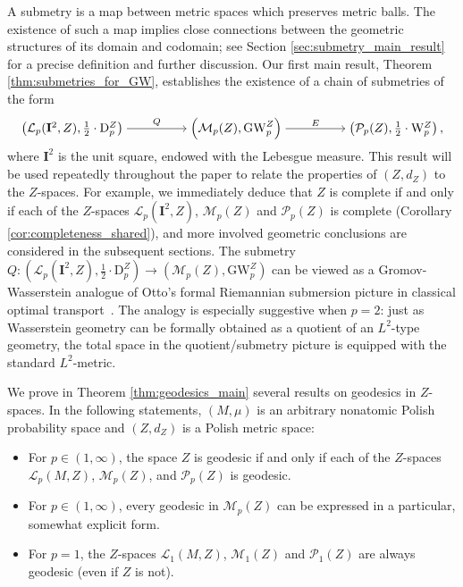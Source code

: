 \documentclass{article}
\theoremstyle{definition}
\newcommand{\M}{\mathcal{M}}
\newcommand{\MZp}{\M_p(Z)}
\newcommand{\MZ}[1]{\M_{#1}(Z)}
\newcommand{\dgwz}{\mathrm{GW}_p^Z}
\newcommand{\WZ}{\mathcal{P}_p(Z)}
\newcommand{\WZp}[1]{\mathcal{P}_{#1}(Z)}
\newcommand{\wz}{\mathrm{W}_p^Z}
\newcommand{\Lp}{\mathcal{L}_p}
\newcommand{\Lpp}[1]{\mathcal{L}_{#1}}
\newcommand{\dpz}{\mathrm{D}^Z_p}
\begin{document}
\smallskip
{} A submetry is a map between metric spaces which preserves metric balls. The existence of such a map implies close connections between the geometric structures of its domain and codomain; see Section \ref{sec:submetry_main_result} for a precise definition and further discussion. Our first main result, Theorem \ref{thm:submetries_for_GW}, establishes the existence of a chain of submetries of the form
\[\begin{tikzcd}[ampersand replacement=\&,cramped]
	{\left(\Lp(\mathbf{I}^2,Z),\frac{1}{2} \cdot \dpz\right)} \&\& {\left(\MZp,\dgwz\right)} \&\& {\left(\WZ,\frac{1}{2} \cdot \wz\right),}
	\arrow["Q", from=1-1, to=1-3]
	\arrow["E", from=1-3, to=1-5]
\end{tikzcd}\]
where $\mathbf{I}^2$ is the unit square, endowed with the Lebesgue measure. This result will be used repeatedly throughout the paper to relate the properties of $(Z,d_Z)$ to the $Z$-spaces. For example, we immediately deduce that $Z$ is complete if and only if each of the $Z$-spaces $\Lp(\mathbf{I}^2,Z)$, $\MZp$ and $\WZ$ is complete (Corollary \ref{cor:completeness_shared}), and more involved geometric conclusions are considered in the subsequent sections. The submetry
$Q:\left(\Lp(\mathbf{I}^2,Z),\frac{1}{2} \cdot \dpz\right)\to \left(\MZp,\dgwz\right) $
can be viewed as a Gromov-Wasserstein analogue of Otto’s formal Riemannian submersion picture in classical optimal transport~\cite{otto2001geometry}. The analogy is especially suggestive when $p=2$: just as Wasserstein geometry can be formally obtained as a quotient of an $L^2$-type geometry, the total space in the quotient/submetry picture is equipped with the standard $L^2$-metric.

\smallskip
{} We prove in Theorem \ref{thm:geodesics_main} several results on geodesics in $Z$-spaces. In the following statements, $(M,\mu)$ is an arbitrary nonatomic Polish probability space and $(Z,d_Z)$ is a Polish metric space:
\begin{itemize}
    \item For $p \in (1,\infty)$, the space $Z$ is geodesic if and only if each of the $Z$-spaces $\Lp(M,Z)$, $\MZp$, and $\WZ$ is geodesic. 
    \item For $p \in (1,\infty)$, every geodesic in $\MZp$ can be expressed in a particular, somewhat explicit form.
    \item For $p =1$, the $Z$-spaces $\Lpp{1}(M,Z)$, $\MZ{1}$ and $\WZp{1}$ are always geodesic (even if $Z$ is not).
\end{itemize}
\end{document}
